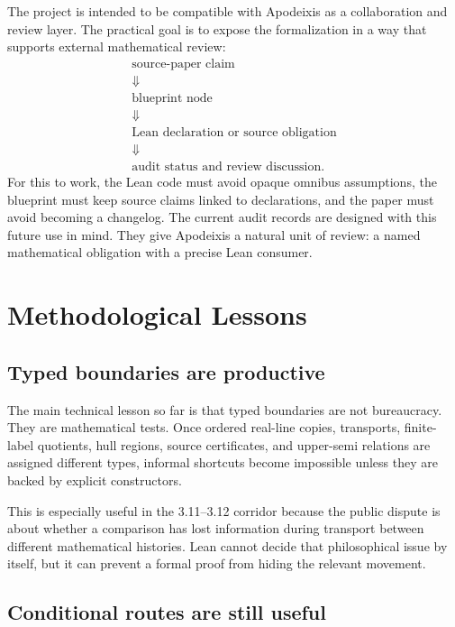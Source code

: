 \documentclass[11pt]{article}
\theoremstyle{plain}
\theoremstyle{definition}
\theoremstyle{remark}
\begin{document}
The project is intended to be compatible with Apodeixis as a collaboration and
review layer.  The practical goal is to expose the formalization in a way that
supports external mathematical review:
\[
\begin{array}{c}
\text{source-paper claim}\\
\Downarrow\\
\text{blueprint node}\\
\Downarrow\\
\text{Lean declaration or source obligation}\\
\Downarrow\\
\text{audit status and review discussion}.
\end{array}
\]
For this to work, the Lean code must avoid opaque omnibus assumptions, the
blueprint must keep source claims linked to declarations, and the paper must
avoid becoming a changelog.  The current audit records are designed with this
future use in mind.  They give Apodeixis a natural unit of review: a named
mathematical obligation with a precise Lean consumer.

\section{Methodological Lessons}

\subsection{Typed boundaries are productive}

The main technical lesson so far is that typed boundaries are not bureaucracy.
They are mathematical tests.  Once ordered real-line copies, transports,
finite-label quotients, hull regions, source certificates, and upper-semi
relations are assigned different types, informal shortcuts become impossible
unless they are backed by explicit constructors.

This is especially useful in the 3.11--3.12 corridor because the public dispute
is about whether a comparison has lost information during transport between
different mathematical histories.  Lean cannot decide that philosophical issue
by itself, but it can prevent a formal proof from hiding the relevant movement.

\subsection{Conditional routes are still useful}
\end{document}
